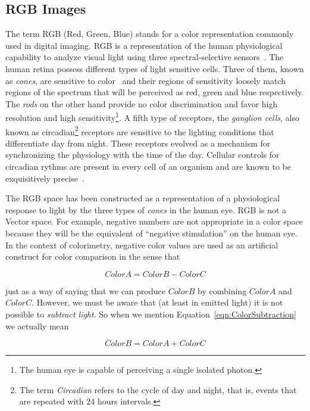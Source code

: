 \subsection{RGB Images}

The term RGB (Red, Green, Blue) stands for a color representation commonly used
in digital imaging. RGB is a representation of the human physiological
capability to analyze visual light using three spectral-selective
sensors~\cite{Malacara2002,Wyszecki2000}. The human retina possess different
types of light sensitive cells. Three of them, known as \emph{cones}, are
sensitive to color~\cite{Gray2003} and their regions of sensitivity loosely
match regions of the spectrum that will be perceived as red, green and blue
respectively. The \emph{rods} on the other hand provide no color discrimination
and favor high resolution and high sensitivity\footnote{The human eye is
capable of perceiving a single isolated photon.}.  A fifth type of receptors,
the \emph{ganglion cells}, also known as circadian\footnote{The term
\emph{Circadian} refers to the cycle of day and night, that is, events that are
repeated with 24 hours intervals.} receptors are sensitive to the lighting
conditions that differentiate day from night.  These receptors evolved as a
mechanism for synchronizing the physiology with the time of the day. Cellular
controls for circadian rythms are present in every cell of an organism and are
known to be exquisitively precise~\cite{Lodish2000}.

The RGB space has been constructed as a representation of a physiological
response to light by the three types of \emph{cones} in the human eye. RGB is
not a Vector space. For example, negative numbers are not appropriate in a
color space because they will be the equivalent of ``negative stimulation'' on
the human eye.  In the context of colorimetry, negative color values are used
as an artificial construct for color comparison in the sense that

\begin{equation}
\label{eqn:ColorSubtraction}
         ColorA = ColorB - ColorC
\end{equation}

just as a way of saying that we can produce $ColorB$ by combining $ColorA$ and
$ColorC$.  However, we must be aware that (at least in emitted light) it is not
possible to \emph{subtract light}. So when we mention
Equation~\ref{eqn:ColorSubtraction} we actually mean

\begin{equation}
\label{eqn:ColorAddition}
         ColorB = ColorA + ColorC
\end{equation}

